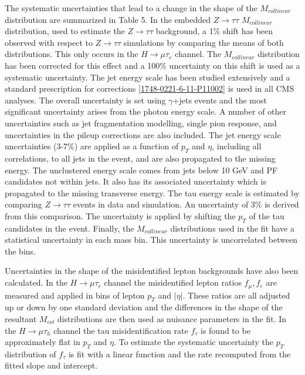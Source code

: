 \documentclass[oneside, letterpaper, oldfontcommands]{memoir}
\begin{document}
\qquad The systematic uncertainties that lead to a change in the shape of the $M_{collinear}$ distribution are summarized in Table 5. In the embedded $Z \rightarrow \tau\tau$ $M_{collinear}$ distribution, used to estimate the $Z \rightarrow \tau\tau$ background, a 1\% shift has been observed with respect to $Z \rightarrow \tau\tau$ simulations by comparing the means of both distributions. This only occurs in the $H \rightarrow \mu\tau_{e}$ channel. The $M_{collinear}$ distribution has been corrected for this effect and a 100\% uncertainty on this shift is used as a systematic uncertainty. The jet energy scale has been studied extensively and a standard prescription for corrections \ref{1748-0221-6-11-P11002} is used in all CMS analyses. The overall uncertainty is set using $\gamma$+jets events and the most significant uncertainty arises from the photon energy scale. A number of other uncertainties such as jet fragmentation modelling, single pion response, and uncertainties in the pileup corrections are also included. The jet energy scale uncertainties (3-7\%) are applied as a function of $p_{T}$ and $\eta$, including all correlations, to all jets in the event, and are also propagated to the missing energy. The unclustered energy scale comes from jets below 10 GeV and PF candidates not within jets. It also has its associated uncertainty which is propagated to the missing transverse energy. The tau energy scale is estimated by comparing $Z \rightarrow \tau\tau$ events in data and simulation. An uncertainty of 3\% is derived from this comparison. The uncertainty is applied by shifting the $p_{T}$ of the tau candidates in the event. Finally, the $M_{collinear}$ distributions used in the fit have a statistical uncertainty in each mass bin. This uncertainty is uncorrelated between the bins.

\qquad Uncertainties in the shape of the misidentified lepton backgrounds have also been calculated. In the $H \rightarrow \mu\tau_{e}$ channel the misidentified lepton ratios $f_{\mu},f_{e}$ are measured and applied in bins of lepton $p_{T}$ and $|\eta|$. These ratios are all adjusted up or down by one standard deviation and the differences in the shape of the resultant $M_{col}$ distributions are then used as nuisance parameters in the fit. In the $H \rightarrow \mu\tau_{h}$ channel the tau misidentification rate $f_{\tau}$ is found to be approximately flat in $p_{T}$ and $\eta$. To estimate the systematic uncertainty the $p_{T}$ distribution of $f_{\tau}$ is fit with a linear function and the rate recomputed from the fitted slope and intercept. 
\end{document}
